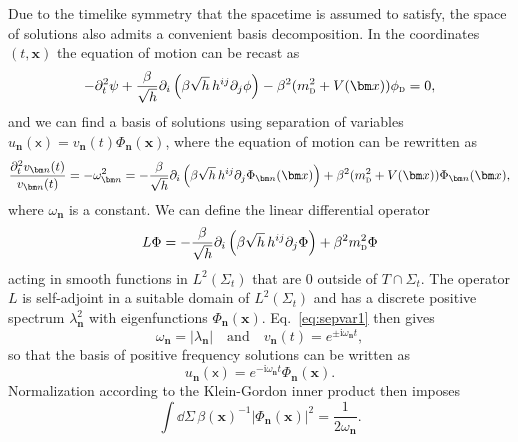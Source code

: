 \documentclass[letterpaper,12pt,titlepage,oneside,final]{book}
\newcommand{\mf}{\mathsf}%
\newcommand{\ii}{\mathrm{i}}
\newcommand{\tc}[1]{\textsc{#1}}
\begin{document}
Due to the timelike symmetry that the spacetime is assumed to satisfy, the space of solutions also admits a convenient basis decomposition. In the coordinates $(t,\bm x)$ the equation of motion can be recast as
\begin{equation}
    - \partial_t^2\psi + \frac{\beta}{\sqrt{h}}\partial_i\left(\beta \sqrt{h}\, h^{ij} \partial_j \phi\right) - \beta^2(m_{\tc{d}}^2 + V(\bm x))\phi_{\tc{d}} = 0,
\end{equation}
and we can find a basis of solutions using separation of variables $u_{\bm n}(\mf x) = v_{\bm n}(t) \Phi_{\bm n}(\bm x)$, where the equation of motion can be rewritten as
\begin{equation}\label{eq:sepvar1}
    \frac{\partial_t^2v_{\bm n}(t)}{v_{\bm n}(t)} = - \omega_{\bm n}^2 = -\frac{\beta}{\sqrt{h}}\partial_i\left(\beta \sqrt{h}\, h^{ij} \partial_j \Phi_{\bm n}(\bm x)\right) + \beta^2(m_\tc{d}^2 + V(\bm x))\Phi_{\bm n}(\bm x),
\end{equation}
where $\omega_{\bm n}$ is a constant. We can define the linear differential operator 
\begin{equation}
    L \Phi = -\frac{\beta}{\sqrt{h}}\partial_i\left(\beta \sqrt{h}\, h^{ij} \partial_j \Phi\right) + \beta^2 m_\tc{d}^2 \Phi
\end{equation}
acting in smooth functions in $L^2(\Sigma_t)$ that are $0$ outside of $T\cap \Sigma_t$. The operator $L$ is self-adjoint in a suitable domain of $L^2(\Sigma_t)$ and has a discrete positive spectrum $\lambda_{\bm n}^2$ with eigenfunctions $\Phi_{\bm n}(\bm x)$. Eq.~\eqref{eq:sepvar1} then gives
\begin{equation}
    \omega_{\bm n} = |\lambda_{\bm n}| \quad \text{and} \quad v_{\bm n}(t) = e^{\pm \ii \omega_{\bm n}t},
\end{equation}
so that the basis of positive frequency solutions can be written as
\begin{equation}\label{eq:un}
    u_{\bm n}(\mf x) = e^{- \ii \omega_{\bm n} t} \Phi_{\bm n}(\bm x).
\end{equation}
Normalization according to the Klein-Gordon inner product then imposes
\begin{equation}\label{eq:normCondPhin}
    \int \dd\Sigma\, \beta(\bm x)^{-1}|\Phi_{\bm n}(\bm x)|^2 = \frac{1}{2\omega_{\bm n}}.
\end{equation}
\end{document}
